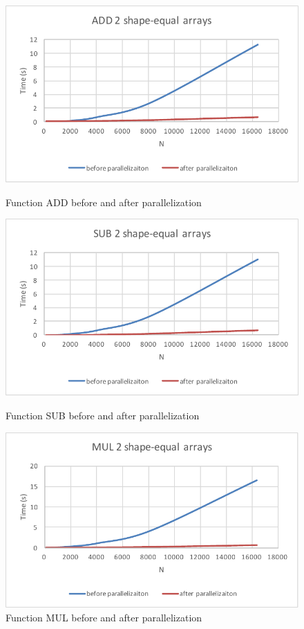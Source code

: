 \begin{figure}[]
\centering
\includegraphics[scale=0.5]{img/add_b_a.pdf}
\caption{Function ADD before and after parallelization}
\label{fig:add_b_a}

\includegraphics[scale=0.5]{img/sub_b_a.pdf}
\caption{Function SUB before and after parallelization}
\label{fig:sub_b_a}

\includegraphics[scale=0.5]{img/mul_b_a.pdf}
\caption{Function MUL before and after parallelization}
\label{fig:mul_b_a}
\end{figure}

